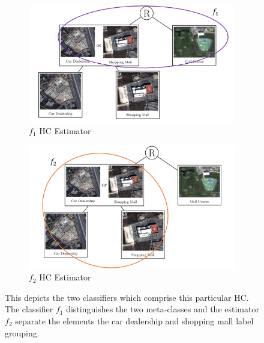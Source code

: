 \documentclass[../thesis.tex]{subfiles}
\begin{document}
\begin{figure}
    \centering
    \begin{subfigure}{.49\linewidth}
        \centering
        \includegraphics[width=\linewidth]{images/ex-hc1.pdf}
        \caption{$f_1$ HC Estimator}
    \end{subfigure}
    \begin{subfigure}{.49\linewidth}
        \centering
        \includegraphics[width=\linewidth]{images/ex-hc2.pdf}
        \caption{$f_2$ HC Estimator}
    \end{subfigure}
    \caption[Example Hierarchical Classifier with Estimator Delineation]{This depicts the two classifiers which comprise this particular HC. The classifier $f_1$ distinguishes the two meta-classes and the estimator $f_2$ separate the elements the car dealership and shopping mall label grouping.}
    \label{fig:hc-w-classifiers}
\end{figure}
\end{document}
